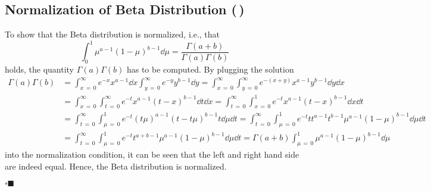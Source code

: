 \documentclass[11pt, a4paper]{scrartcl}
\newcommand{\qedeot}{\hfill\(\square\blacksquare\)}
\newcommand{\diffstar}{\texorpdfstring{\raisebox{-1pt}{\resizebox{!}{8pt}{\(\star\)}}}{*}}
\newcommand{\twostar}  {(\diffstar\,\diffstar)}
\begin{document}
		\subsection{Normalization of Beta Distribution  \twostar}
			To show that the Beta distribution is normalized, i.e., that
			\begin{equation}
				\int_{0}^{1}\! \mu^{a - 1} (1 - \mu)^{b - 1} \dd{\mu} = \frac{\Gamma(a + b)}{\Gamma(a) \Gamma(b)}
			\end{equation}
			holds, the quantity \( \Gamma(a) \Gamma(b) \) has to be computed. By plugging the solution
			\begin{align}
				\Gamma(a) \Gamma(b)
					&= \int_{x \,=\, 0}^{\infty}\! e^{-x} x^{a - 1} \dd{x} \int_{y \,=\, 0}^{\infty}\! e^{-y} y^{b - 1} \dd{y}
					 = \int_{x \,=\, 0}^{\infty} \int_{y \,=\, 0}^{\infty}\! e^{-(x + y)} x^{a - 1} y^{b - 1} \dd{y} \dd{x} \\
					&= \int_{x \,=\, 0}^{\infty} \int_{t \,=\, 0}^{\infty}\! e^{-t} x^{a - 1} (t - x)^{b - 1} \dd{t} \dd{x}
					 = \int_{t \,=\, 0}^{\infty} \int_{x \,=\, 0}^{1}\! e^{-t} x^{a - 1} (t - x)^{b - 1} \dd{x} \dd{t} \\
					&= \int_{t \,=\, 0}^{\infty} \int_{\mu \,=\, 0}^{1}\! e^{-t} (t\mu)^{a - 1} (t - t\mu)^{b - 1} t \dd{\mu} \dd{t}
					 = \int_{t \,=\, 0}^{\infty} \int_{\mu \,=\, 0}^{1}\! e^{-t} t t^{a - 1} t^{b - 1} \mu^{a - 1} (1 - \mu)^{b - 1} \dd{\mu} \dd{t} \\
					&= \int_{t \,=\, 0}^{\infty} \int_{\mu \,=\, 0}^{1}\! e^{-t} t^{a + b - 1} \mu^{a - 1} (1 - \mu)^{b - 1} \dd{\mu} \dd{t}
					 = \Gamma(a + b) \int_{\mu \,=\, 0}^{1}\! \mu^{a - 1} (1 - \mu)^{b - 1} \dd{\mu}
			\end{align}
			into the normalization condition, it can be seen that the left and right hand side are indeed equal. Hence, the Beta distribution is normalized.

			\qedeot
\end{document}
